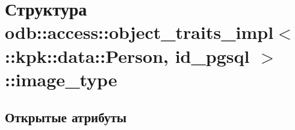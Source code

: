 \hypertarget{structodb_1_1access_1_1object__traits__impl_3_01_1_1kpk_1_1data_1_1_person_00_01id__pgsql_01_4_1_1image__type}{}\section{Структура odb\+:\+:access\+:\+:object\+\_\+traits\+\_\+impl$<$ \+:\+:kpk\+:\+:data\+:\+:Person, id\+\_\+pgsql $>$\+:\+:image\+\_\+type}
\label{structodb_1_1access_1_1object__traits__impl_3_01_1_1kpk_1_1data_1_1_person_00_01id__pgsql_01_4_1_1image__type}
\subsection*{Открытые атрибуты}
